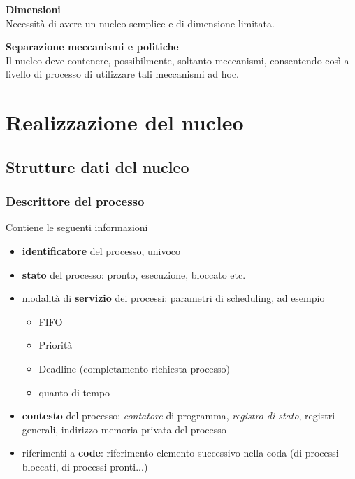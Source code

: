 \begin{mdframed}[topline=false,bottomline=false,rightline=false]
\textbf{Dimensioni}\\
Necessità di avere un nucleo semplice e di dimensione limitata.
\end{mdframed}

\begin{mdframed}[topline=false,bottomline=false,rightline=false]
\textbf{Separazione meccanismi e politiche}\\
Il nucleo deve contenere, possibilmente, soltanto meccanismi, consentendo così a livello di processo di utilizzare tali meccanismi ad hoc.
\end{mdframed}

\section{Realizzazione del nucleo}

\subsection{Strutture dati del nucleo}

\subsubsection{Descrittore del processo}

Contiene le seguenti informazioni
\begin{itemize}
    \item \textbf{identificatore} del processo, univoco
    \item \textbf{stato} del processo: pronto, esecuzione, bloccato etc.
    \item modalità di \textbf{servizio} dei processi: parametri di scheduling, ad esempio
    \begin{itemize}
        \item FIFO
        \item Priorità
        \item Deadline (completamento richiesta processo)
        \item quanto di tempo
    \end{itemize}
    \item \textbf{contesto} del processo: \textit{contatore} di programma, \textit{registro di stato}, registri generali, indirizzo memoria privata del processo
    \item riferimenti a \textbf{code}: riferimento elemento successivo nella coda (di processi bloccati, di processi pronti...)
\end{itemize}

